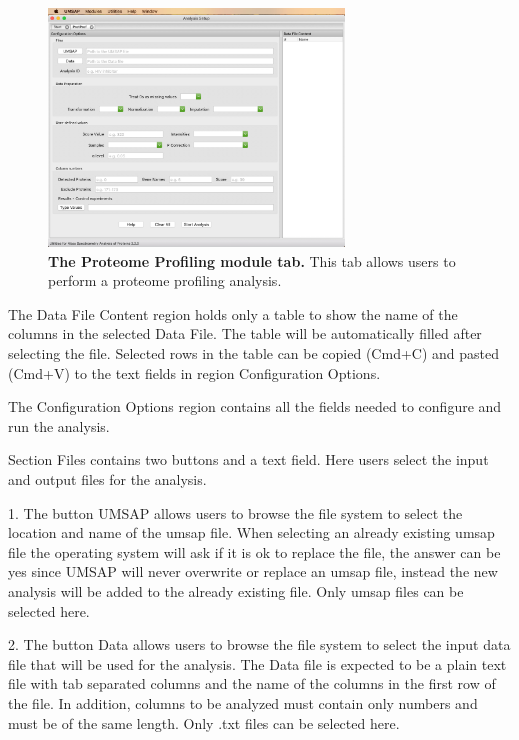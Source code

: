 \begin{figure}[h]
    \centering
    \includegraphics[width=0.7\textwidth]{./IMAGES/MOD-PROTPROF/protprof-mod.jpg}
    \caption[The Proteome Profiling module tab]{\textbf{The Proteome Profiling module
    tab.} This tab allows users to perform a proteome profiling analysis.}
    \label{fig:protprofTab}
    \vspace{-5pt}
\end{figure}

The Data File Content region holds only a table to show the name of the columns in
the selected Data File. The table will be automatically filled after selecting the
file. Selected rows in the table can be copied (Cmd+C) and pasted (Cmd+V) to the
text fields in region Configuration Options.

The Configuration Options region contains all the fields needed to configure and
run the analysis.

Section Files contains two buttons and a text field. Here users select the input
and output files for the analysis.

\num{1}. The button UMSAP allows users to browse the file system to select the location
and name of the umsap file. When selecting an already existing umsap file the operating
system will ask if it is ok to replace the file, the answer can be yes since UMSAP
will never overwrite or replace an umsap file, instead the new analysis will be
added to the already existing file. Only umsap files can be selected here.

\num{2}. The button Data allows users to browse the file system to select the input
data file that will be used for the analysis. The Data file is expected to be a
plain text file with tab separated columns and the name of the columns in the first
row of the file. In addition, columns to be analyzed must contain only numbers and
must be of the same length. Only .txt files can be selected here.

